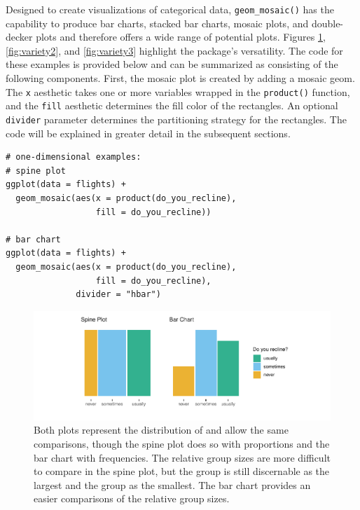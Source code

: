 Designed to create visualizations of categorical data, \texttt{geom\_mosaic()} has the capability to produce bar charts, stacked bar charts, mosaic plots, and double-decker plots and therefore offers a wide range of potential plots. Figures \ref{fig:variety1}, \ref{fig:variety2}, and \ref{fig:variety3} highlight the package's versatility. The code for these examples is provided below and can be summarized as consisting of the following components. First, the mosaic plot is created by adding a mosaic geom. The \texttt{x} aesthetic takes one or more variables wrapped in the \texttt{product()} function, and the \texttt{fill} aesthetic determines the fill color of the rectangles. An optional \texttt{divider} parameter determines the partitioning strategy for the rectangles. The code will be explained in greater detail in the subsequent sections.

\begin{verbatim}
# one-dimensional examples:
# spine plot
ggplot(data = flights) + 
  geom_mosaic(aes(x = product(do_you_recline), 
                  fill = do_you_recline))

# bar chart
ggplot(data = flights) + 
  geom_mosaic(aes(x = product(do_you_recline),
                  fill = do_you_recline), 
              divider = "hbar") 
\end{verbatim}

\begin{figure}[!h]

{\centering \includegraphics[width=1\linewidth]{RJ-2023-013_files/figure-latex/variety1-1} 

}

\caption{Both plots represent the distribution of  and allow the same comparisons, though the spine plot does so with proportions and the bar chart with frequencies. The relative group sizes are more difficult to compare in the spine plot, but the  group is still discernable as the largest and the  group as the smallest. The bar chart provides an easier comparisons of the relative group sizes.}\label{fig:variety1}
\end{figure}

